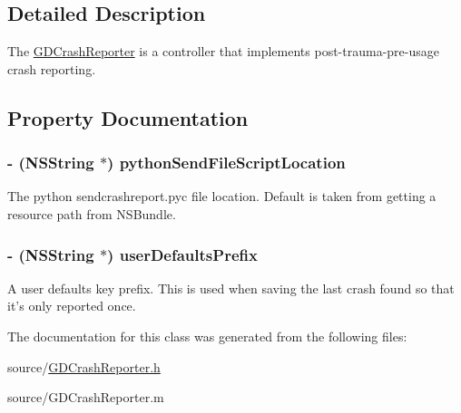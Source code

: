 \subsection{Detailed Description}
The \hyperlink{interface_g_d_crash_reporter}{GDCrashReporter} is a controller that implements post-\/trauma-\/pre-\/usage crash reporting. 

\subsection{Property Documentation}
\hypertarget{interface_g_d_crash_reporter_a1e124e291a81c89405432cdccffcbb15}{
\subsubsection[{pythonSendFileScriptLocation}]{\setlength{\rightskip}{0pt plus 5cm}-\/ ({\bf NSString} $\ast$) pythonSendFileScriptLocation}}
\label{interface_g_d_crash_reporter_a1e124e291a81c89405432cdccffcbb15}


The python sendcrashreport.pyc file location. Default is taken from getting a resource path from NSBundle. \hypertarget{interface_g_d_crash_reporter_a4d6febfc475539bfbde40d2662abaad7}{
\subsubsection[{userDefaultsPrefix}]{\setlength{\rightskip}{0pt plus 5cm}-\/ ({\bf NSString} $\ast$) userDefaultsPrefix}}
\label{interface_g_d_crash_reporter_a4d6febfc475539bfbde40d2662abaad7}


A user defaults key prefix. This is used when saving the last crash found so that it's only reported once. 

The documentation for this class was generated from the following files:\begin{DoxyCompactItemize}
\item 
source/\hyperlink{_g_d_crash_reporter_8h}{GDCrashReporter.h}\item 
source/GDCrashReporter.m\end{DoxyCompactItemize}

